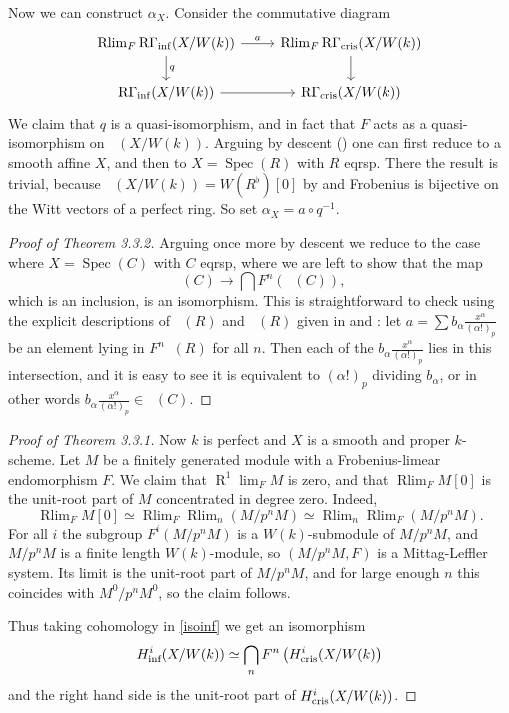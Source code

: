 \documentclass[11pt]{article}
\theoremstyle{plain}
\theoremstyle{definition}
\theoremstyle{remark}
\numberwithin{equation}{section}
\newcommand{\prf}{ \begin{proof} }
\newcommand{\epr}{ \end{proof} }
\DeclareMathOperator{\Spec}{Spec}                                        %
\newcommand{\W}{W}                                                       %
\DeclareMathOperator{\Rlim}{Rlim}                                        %
\DeclareMathOperator{\Rder}{\text{R}}                                    %
\DeclareMathOperator{\Acr}{\mathbb{A}_{cris}}                            %
\DeclareMathOperator{\Ainf}{\mathbb{A}_{inf}}                            %
\newcommand\perf[1]{#1^{\flat}}                                          %
\DeclareMathOperator{\Rcris}{R\Gamma_{cris}}                             %
\newcommand\Hcris[1]{H^{#1}_{\textnormal{cris}}}                         %
\newcommand\Hinf[1]{H^{#1}_{\textnormal{inf}}}                         %
\DeclareMathOperator{\Rinf}{R\Gamma_{inf}}                             %
\begin{document}
Now we can construct $\alpha_X$. Consider the commutative diagram
\[\begin{tikzcd}
	{\Rlim_F\Rinf(X/\W(k))} & {\Rlim_F\Rcris(X/\W(k))} \\
	{\Rinf(X/\W(k))} & {\Rcris(X/\W(k))}
	\arrow["a", from=1-1, to=1-2]
	\arrow["q", from=1-1, to=2-1]
	\arrow[from=1-2, to=2-2]
	\arrow[from=2-1, to=2-2]
\end{tikzcd}\]
We claim that $q$ is a quasi-isomorphism, and in fact that $F$ acts as a quasi-isomorphism on $\Rinf(X/\W(k))$. Arguing by descent () one can first reduce to a smooth affine $X$, and then to $X=\Spec(R)$ with $R$ eqrsp. There the result is trivial, because $\Rinf(X/\W(k))=\W(\perf{R})[0]$ by  and Frobenius is bijective on the Witt vectors of a perfect ring. So set $\alpha_X=a\circ q^{-1}$.

\prf[Proof of Theorem 3.3.2]

Arguing once more by descent we reduce to the case where $X=\Spec(C)$ with $C$ eqrsp, where we are left to show that the map
\[
\Ainf(C)\to\bigcap F^n\left(\Acr(C)\right),
\]
which is an inclusion, is an isomorphism. This is straightforward to check using the explicit descriptions of $\Ainf(R)$ and $\Acr(R)$ given in  and : let $a=\sum b_{\alpha}\frac{x^{\alpha}}{(\alpha!)_p}$ be an element lying in $F^n\Acr(R)$ for all $n$. Then each of the $b_{\alpha}\frac{x^{\alpha}}{(\alpha!)_p}$ lies in this intersection, and it is easy to see it is equivalent to $(\alpha!)_p$ dividing $b_{\alpha}$, or in other words $b_{\alpha}\frac{x^{\alpha}}{(\alpha!)_p}\in\Ainf(C)$.
\epr

\prf[Proof of Theorem 3.3.1]
Now $k$ is perfect and $X$ is a smooth and proper $k$-scheme. Let $M$ be a finitely generated module with a Frobenius-limear endomorphism $F$. We claim that $\Rder^1\lim_FM$ is zero, and that $\Rlim_FM[0]$ is the unit-root part of $M$ concentrated in degree zero. Indeed, 
\[
\Rlim_FM[0]\simeq\Rlim_F\Rlim_n\left(M/p^nM\right)\simeq\Rlim_n\Rlim_F(M/p^nM).
\]
For all $i$ the subgroup $F^i(M/p^nM)$ is a $\W(k)$-submodule of $M/p^nM$, and $M/p^nM$ is a finite length $\W(k)$-module, so $(M/p^nM,F)$ is a Mittag-Leffler system. Its limit is the unit-root part of $M/p^nM$, and for large enough $n$ this coincides with $M^0/p^nM^0$, so the claim follows.

Thus taking cohomology in \eqref{isoinf} we get an isomorphism
\[
\Hinf{i}(X/\W(k))\simeq\bigcap_nF^n\left(\Hcris{i}(X/\W(k)\right)
\]
and the right hand side is the unit-root part of $\Hcris{i}(X/\W(k))$.
\epr
\end{document}
